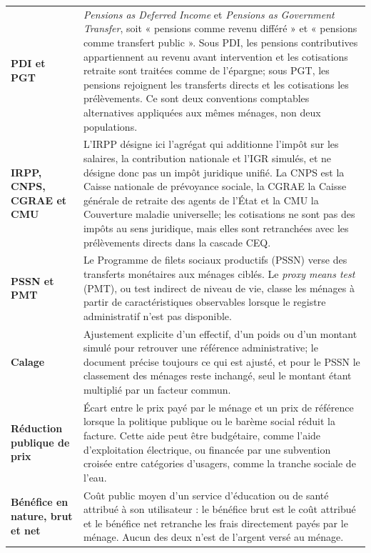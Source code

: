 \documentclass[11pt,a4paper]{article}
\begin{document}
\begin{longtable}{>{\RaggedRight\arraybackslash}p{}
                  >{\RaggedRight\arraybackslash}p{}}
\textbf{PDI et PGT}
& \emph{Pensions as Deferred Income} et \emph{Pensions as Government Transfer},
soit « pensions comme revenu différé » et « pensions comme transfert public ».
Sous PDI, les pensions contributives appartiennent au revenu avant intervention
et les cotisations retraite sont traitées comme de l'épargne; sous PGT, les
pensions rejoignent les transferts directs et les cotisations les prélèvements.
Ce sont deux conventions comptables alternatives appliquées aux mêmes ménages,
non deux populations. \\[0.35em]

\textbf{IRPP, CNPS, CGRAE et CMU}
& L'IRPP désigne ici l'agrégat qui additionne l'impôt
sur les salaires, la contribution nationale et l'IGR simulés, et ne désigne donc
pas un impôt juridique unifié. La CNPS est la Caisse nationale de prévoyance
sociale, la CGRAE la Caisse générale de retraite des agents de l'État et la CMU
la Couverture maladie universelle; les cotisations ne sont pas des impôts au
sens juridique, mais elles sont retranchées avec les prélèvements directs dans
la cascade CEQ. \\[0.35em]

\textbf{PSSN et PMT}
& Le Programme de filets sociaux productifs (PSSN) verse des transferts
monétaires aux ménages ciblés. Le \emph{proxy means test} (PMT), ou test
indirect de niveau de vie, classe les ménages à partir de caractéristiques
observables lorsque le registre administratif n'est pas disponible. \\[0.35em]

\textbf{Calage}
& Ajustement explicite d'un effectif, d'un poids ou d'un montant simulé pour
retrouver une référence administrative; le document précise toujours ce qui est
ajusté, et pour le PSSN le classement des ménages reste inchangé, seul le
montant étant multiplié par un facteur commun. \\[0.35em]

\textbf{Réduction publique de prix}
& Écart entre le prix payé par le ménage et un prix de référence lorsque la
politique publique ou le barème social réduit la facture. Cette aide peut être
budgétaire, comme l'aide d'exploitation électrique, ou financée par une
subvention croisée entre catégories d'usagers, comme la tranche sociale de
l'eau. \\[0.35em]

\textbf{Bénéfice en nature, brut et net}
& Coût public moyen d'un service d'éducation ou de santé attribué à son
utilisateur : le bénéfice brut est le coût attribué et le bénéfice net retranche
les frais directement payés par le ménage. Aucun des deux n'est de l'argent
versé au ménage. \\[0.35em]


\end{longtable}
\end{document}
